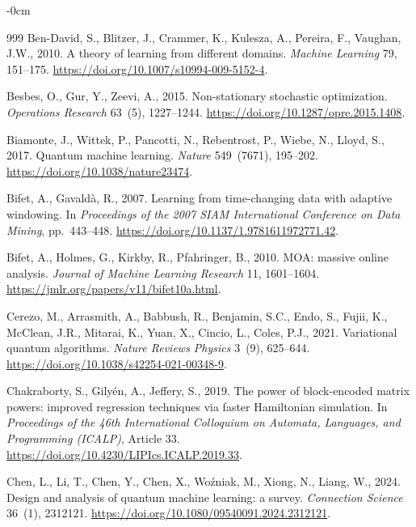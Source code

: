 \documentclass[sensors,article,submit,pdftex,moreauthors]{Definitions/mdpi}
\begin{document}
\begin{adjustwidth}{-\extralength}{0cm}
\begin{thebibliography}{999}
Ben-David, S., Blitzer, J., Crammer, K., Kulesza, A., Pereira, F., Vaughan, J.W., 2010.
\newblock A theory of learning from different domains.
\newblock \emph{Machine Learning} 79, 151--175.
\newblock \url{https://doi.org/10.1007/s10994-009-5152-4}.

Besbes, O., Gur, Y., Zeevi, A., 2015.
\newblock Non-stationary stochastic optimization.
\newblock \emph{Operations Research} 63~(5), 1227--1244.
\newblock \url{https://doi.org/10.1287/opre.2015.1408}.

Biamonte, J., Wittek, P., Pancotti, N., Rebentrost, P., Wiebe, N., Lloyd, S., 2017.
\newblock Quantum machine learning.
\newblock \emph{Nature} 549~(7671), 195--202.
\newblock \url{https://doi.org/10.1038/nature23474}.

Bifet, A., Gavald\`a, R., 2007.
\newblock Learning from time-changing data with adaptive windowing.
\newblock In \emph{Proceedings of the 2007 SIAM International Conference on Data Mining}, pp.~443--448.
\newblock \url{https://doi.org/10.1137/1.9781611972771.42}.

Bifet, A., Holmes, G., Kirkby, R., Pfahringer, B., 2010.
\newblock MOA: massive online analysis.
\newblock \emph{Journal of Machine Learning Research} 11, 1601--1604.
\newblock \url{https://jmlr.org/papers/v11/bifet10a.html}.

Cerezo, M., Arrasmith, A., Babbush, R., Benjamin, S.C., Endo, S., Fujii, K., McClean, J.R., Mitarai, K., Yuan, X., Cincio, L., Coles, P.J., 2021.
\newblock Variational quantum algorithms.
\newblock \emph{Nature Reviews Physics} 3~(9), 625--644.
\newblock \url{https://doi.org/10.1038/s42254-021-00348-9}.

Chakraborty, S., Gily\'en, A., Jeffery, S., 2019.
\newblock The power of block-encoded matrix powers: improved regression techniques via faster Hamiltonian simulation.
\newblock In \emph{Proceedings of the 46th International Colloquium on Automata, Languages, and Programming (ICALP)}, Article 33.
\newblock \url{https://doi.org/10.4230/LIPIcs.ICALP.2019.33}.

Chen, L., Li, T., Chen, Y., Chen, X., Wo\'zniak, M., Xiong, N., Liang, W., 2024.
\newblock Design and analysis of quantum machine learning: a survey.
\newblock \emph{Connection Science} 36~(1), 2312121.
\newblock \url{https://doi.org/10.1080/09540091.2024.2312121}.


\end{thebibliography}
\end{adjustwidth}
\end{document}
